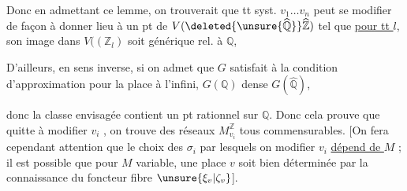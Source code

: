 Donc en admettant ce lemme, on trouverait que tt syst. $v_1\ldots v_n$ peut se modifier  de façon à donner lieu à un pt  de $V(\deleted{\unsure{\widehat{\mathbb Q}}}\widehat{\mathbb Z})$  tel que \uline{pour tt $l$},  son image dans $V(( \mathbb Z_l)$ soit générique rel. à $\mathbb Q$,

D'ailleurs, en sens inverse, si on admet que $G$ satisfait à la condition d'approximation pour la place à l'infini, $G(\mathbb Q)$ dense  $G(\widehat{\mathbb Q})$,

 donc la classe envisagée  contient un pt rationnel sur $\mathbb Q$. Donc cela prouve que quitte à modifier $v_i$ , on trouve des réseaux $M_{v_i}^{\mathbb Z}$ tous commensurables.
[On fera cependant attention que le choix des $\sigma_i$ par lesquels on  modifier $v_i$ \uline{dépend de $M$} ; il est possible que pour $M$ variable, une place $v$ soit bien déterminée par la connaissance du foncteur fibre $\unsure{\xi_v|\zeta_v}$].
